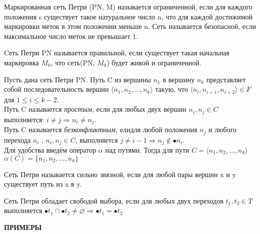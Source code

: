 \documentclass[a4paper,14pt]{article}
\newenvironment{definition}[1]{\begin{trivlist}
\item[\hskip \labelsep {\bfseries #1}]}{\end{trivlist}}
\begin{document}
\begin{definition}{Определение: Ограниченность(Bounded), безопасность(Safe)}
Маркированная сеть Петри (PN, M) называется ограниченной,
 если для каждого положения s существует такое натуральное число n, что для каждой достижимой маркировки меток в этом положении  меньше n. Сеть называется безопасной, если максимальное число меток не превышает 1.
\end{definition}
 
 
\begin{definition}{Определение: Правильность(Well-formed)}
Cеть Петри PN называется правильной, если существует такая начальная маркировка $M_{0}$, что сеть(PN, $M_{0}$) будет живой и ограниченной.
\end{definition} 

\begin{definition}{Определение: Путь}
Пусть дана сеть Петри PN. Путь C из вершины  $n_{1}$ в вершину $n_{k}$ представляет собой последовательность вершин $\langle n_{1},n_{2},...,n_{k} \rangle$ такую, что  $\langle n_{i},n_{i+1},n_{i+2}  \rangle \in F$ для $1 \leq i \leq k-2$. \\Путь C называется \textit{простым}, если для любых двух вершин $n_{i}, n_{j} \in C$ выполняется: $i \neq j \Rightarrow n_{i} \neq n_{j}$. \\Путь C называется \textit{безконфликтным}, елидля любой положения $n_{j}$ и любого перехода $n_{i}$ , $n_{i}, n_{j} \in C$, выполняется $j \neq i-1 \Rightarrow n_{j} \not\in \bullet n_{i}$.\\
Для удобства введём оператор $\alpha$ над путями. Тогда для пути $C = \langle n_{1},n_{2},...,n_{k} \rangle$  $\alpha (C) = \lbrace n_{1},n_{2},...,n_{k} \rbrace$
\end{definition} 
 
\begin{definition}{Определение: Сильная связность(Strongly Connected)}
Сеть Петри называется сильно звязной, если для любой пары вершин x и y существует путь из x в y.
\end{definition} 
 
\begin{definition}{Определение: Свободный выбор(Free-Choice)} 
Сеть Петри обладает свободой выбора, если для любых двух переходов $t_{1}, t_{2} \in T$ выполняется $\bullet t_{1} \cap \bullet t_{2} \neq \varnothing \Rightarrow \bullet t_{1} = \bullet t_{2}$
\end{definition} 
\textbf{ПРИМЕРЫ}
\end{document}
